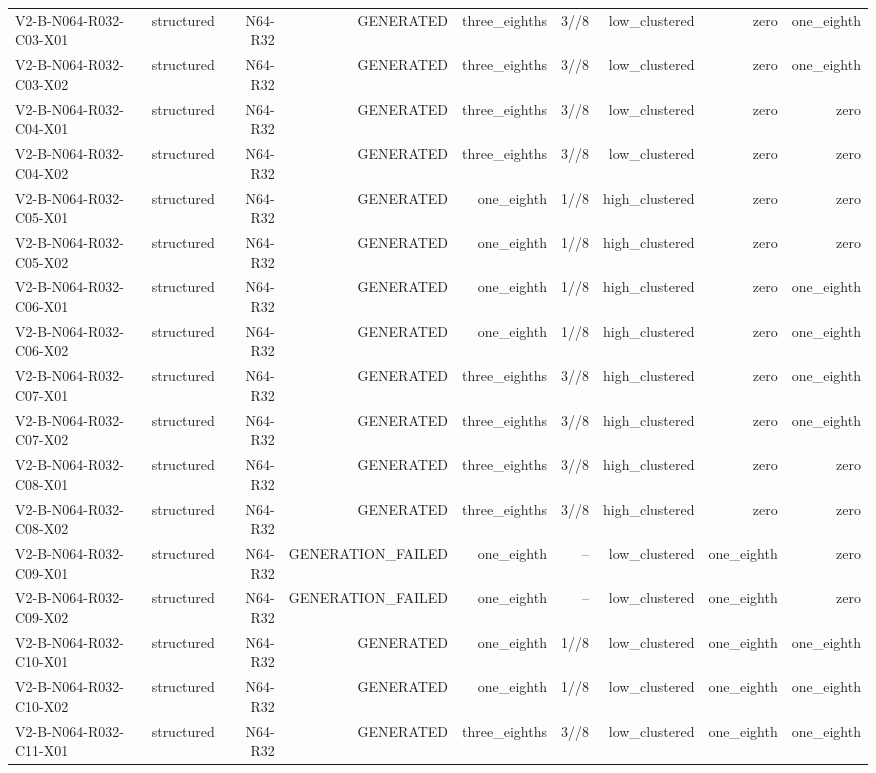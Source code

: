 {\begin{longtable}{lrrrrrrrr}
V2-B-N064-R032-C03-X01 & structured & N64-R32 & GENERATED & three\_eighths & 3//8 & low\_clustered & zero & one\_eighth \\
V2-B-N064-R032-C03-X02 & structured & N64-R32 & GENERATED & three\_eighths & 3//8 & low\_clustered & zero & one\_eighth \\
V2-B-N064-R032-C04-X01 & structured & N64-R32 & GENERATED & three\_eighths & 3//8 & low\_clustered & zero & zero \\
V2-B-N064-R032-C04-X02 & structured & N64-R32 & GENERATED & three\_eighths & 3//8 & low\_clustered & zero & zero \\
V2-B-N064-R032-C05-X01 & structured & N64-R32 & GENERATED & one\_eighth & 1//8 & high\_clustered & zero & zero \\
V2-B-N064-R032-C05-X02 & structured & N64-R32 & GENERATED & one\_eighth & 1//8 & high\_clustered & zero & zero \\
V2-B-N064-R032-C06-X01 & structured & N64-R32 & GENERATED & one\_eighth & 1//8 & high\_clustered & zero & one\_eighth \\
V2-B-N064-R032-C06-X02 & structured & N64-R32 & GENERATED & one\_eighth & 1//8 & high\_clustered & zero & one\_eighth \\
V2-B-N064-R032-C07-X01 & structured & N64-R32 & GENERATED & three\_eighths & 3//8 & high\_clustered & zero & one\_eighth \\
V2-B-N064-R032-C07-X02 & structured & N64-R32 & GENERATED & three\_eighths & 3//8 & high\_clustered & zero & one\_eighth \\
V2-B-N064-R032-C08-X01 & structured & N64-R32 & GENERATED & three\_eighths & 3//8 & high\_clustered & zero & zero \\
V2-B-N064-R032-C08-X02 & structured & N64-R32 & GENERATED & three\_eighths & 3//8 & high\_clustered & zero & zero \\
V2-B-N064-R032-C09-X01 & structured & N64-R32 & GENERATION\_FAILED & one\_eighth & -- & low\_clustered & one\_eighth & zero \\
V2-B-N064-R032-C09-X02 & structured & N64-R32 & GENERATION\_FAILED & one\_eighth & -- & low\_clustered & one\_eighth & zero \\
V2-B-N064-R032-C10-X01 & structured & N64-R32 & GENERATED & one\_eighth & 1//8 & low\_clustered & one\_eighth & one\_eighth \\
V2-B-N064-R032-C10-X02 & structured & N64-R32 & GENERATED & one\_eighth & 1//8 & low\_clustered & one\_eighth & one\_eighth \\
V2-B-N064-R032-C11-X01 & structured & N64-R32 & GENERATED & three\_eighths & 3//8 & low\_clustered & one\_eighth & one\_eighth \\

\end{longtable}}
